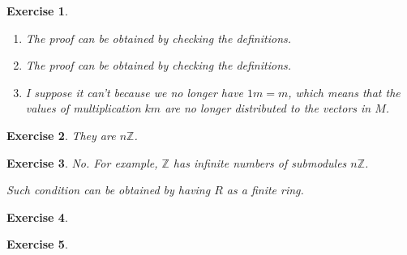 \documentclass{article}
\theoremstyle{breakstyle}
\newtheorem{exercise}{Exercise}[section]
\begin{document}
\begin{exercise}
    \leavevmode \vspace{-\baselineskip}
    \begin{enumerate}[label=\roman*.]
        \item The proof can be obtained by checking the definitions.
        \item The proof can be obtained by checking the definitions.
        \item I suppose it can't because we no longer have $1m = m$, which means that the values of multiplication $km$ are no longer distributed to the vectors in $M$.
    \end{enumerate}
\end{exercise}

\begin{exercise}
    They are $n\mathbb{Z}$.
\end{exercise}

\begin{exercise}
    No. For example, $\mathbb{Z}$ has infinite numbers of submodules $n\mathbb{Z}$.

    Such condition can be obtained by having $R$ as a finite ring.
\end{exercise}

\begin{exercise}
\end{exercise}

\begin{exercise}
\end{exercise}
\end{document}
